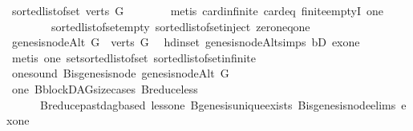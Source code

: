 \begin{isabellebody}
\ {\isachardoublequoteopen}sorted{\isacharunderscore}{\kern0pt}list{\isacharunderscore}{\kern0pt}of{\isacharunderscore}{\kern0pt}set\ {\isacharparenleft}{\kern0pt}verts\ G{\isacharparenright}{\kern0pt}\ {\isasymnoteq}\ {\isacharbrackleft}{\kern0pt}{\isacharbrackright}{\kern0pt}{\isachardoublequoteclose}\isanewline
\ \ \ \ \isamarkupfalse%
\ {\isacharparenleft}{\kern0pt}metis\ card{\isachardot}{\kern0pt}infinite\ card{\isacharunderscore}{\kern0pt}{}{\isacharunderscore}{\kern0pt}eq\ finite{\isachardot}{\kern0pt}emptyI\ one\ \isanewline
\ \ \ \ \ \ \ \ sorted{\isacharunderscore}{\kern0pt}list{\isacharunderscore}{\kern0pt}of{\isacharunderscore}{\kern0pt}set{\isacharunderscore}{\kern0pt}empty\ sorted{\isacharunderscore}{\kern0pt}list{\isacharunderscore}{\kern0pt}of{\isacharunderscore}{\kern0pt}set{\isacharunderscore}{\kern0pt}inject\ zero{\isacharunderscore}{\kern0pt}neq{\isacharunderscore}{\kern0pt}one{\isacharparenright}{\kern0pt}\ \isanewline
\ \ \isamarkupfalse%
\ \isamarkupfalse%
\ {\isachardoublequoteopen}genesis{\isacharunderscore}{\kern0pt}nodeAlt\ G\ {\isasymin}\ verts\ G{\isachardoublequoteclose}\ \isamarkupfalse%
\ hd{\isacharunderscore}{\kern0pt}in{\isacharunderscore}{\kern0pt}set\ genesis{\isacharunderscore}{\kern0pt}nodeAlt{\isachardot}{\kern0pt}simps\ bD\ exone\isanewline
\ \ \ \ \isamarkupfalse%
\ {\isacharparenleft}{\kern0pt}metis\ one\ set{\isacharunderscore}{\kern0pt}sorted{\isacharunderscore}{\kern0pt}list{\isacharunderscore}{\kern0pt}of{\isacharunderscore}{\kern0pt}set\ sorted{\isacharunderscore}{\kern0pt}list{\isacharunderscore}{\kern0pt}of{\isacharunderscore}{\kern0pt}set{\isachardot}{\kern0pt}infinite{\isacharparenright}{\kern0pt}\ \isanewline
\ \ \isamarkupfalse%
\ \isamarkupfalse%
\ one{\isacharunderscore}{\kern0pt}sound{\isacharcolon}{\kern0pt}\ {\isachardoublequoteopen}B{\isachardot}{\kern0pt}is{\isacharunderscore}{\kern0pt}genesis{\isacharunderscore}{\kern0pt}node\ {\isacharparenleft}{\kern0pt}genesis{\isacharunderscore}{\kern0pt}nodeAlt\ G{\isacharparenright}{\kern0pt}{\isachardoublequoteclose}\isanewline
\ \ \ \ \isamarkupfalse%
\ one\ B{\isachardot}{\kern0pt}blockDAG{\isacharunderscore}{\kern0pt}size{\isacharunderscore}{\kern0pt}cases\ B{\isachardot}{\kern0pt}reduce{\isacharunderscore}{\kern0pt}less\isanewline
\ \ \ \ \ \ B{\isachardot}{\kern0pt}reduce{\isacharunderscore}{\kern0pt}past{\isacharunderscore}{\kern0pt}dagbased\ less{\isacharunderscore}{\kern0pt}one\ B{\isachardot}{\kern0pt}genesis{\isacharunderscore}{\kern0pt}unique{\isacharunderscore}{\kern0pt}exists\ B{\isachardot}{\kern0pt}is{\isacharunderscore}{\kern0pt}genesis{\isacharunderscore}{\kern0pt}node{\isachardot}{\kern0pt}elims{\isacharparenleft}{\kern0pt}{}{\isacharparenright}{\kern0pt}\ exone\isanewline

\end{isabellebody}
